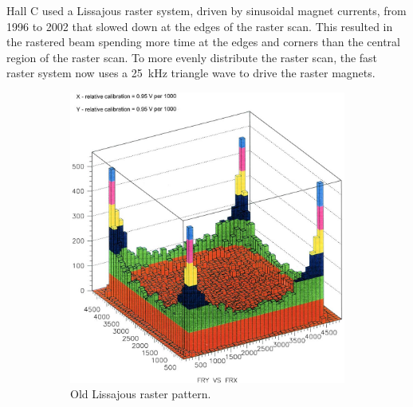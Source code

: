 Hall C used a Lissajous raster system, driven by sinusoidal magnet currents,
from 1996 to 2002 that slowed down at the edges of the raster scan.
This resulted in the rastered beam spending more time at the edges and corners
than the central region of the raster scan.
To more evenly distribute the raster scan, the fast raster system now uses a
\SI{25}{\kilo\Hz} triangle wave to drive the raster magnets.

\begin{figure}[h]
    \centering
    \begin{subfigure}[b]{0.4\textwidth}
        \centering
        \includegraphics[width=\textwidth]{chap3/Lissajous_raster_colz.jpg}
        \caption{Old Lissajous raster pattern.}
        \label{fig:Lissajous_raster}
    \end{subfigure}
    \hfill
    \begin{subfigure}[b]{0.4\textwidth}
        \centering

\end{subfigure}
\end{figure}
